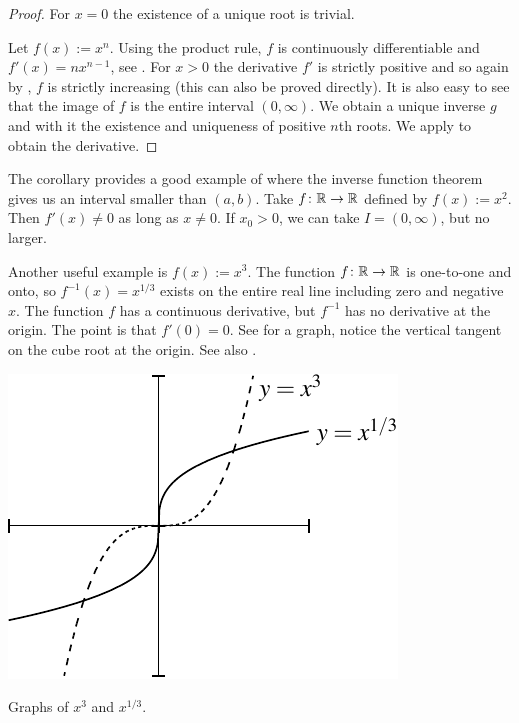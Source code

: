 \begin{proof}
For $x=0$ the existence of a unique root is trivial.

Let $f(x) := x^n$.  Using the product rule, $f$ is continuously differentiable
and $f'(x) = nx^{n-1}$, see .  For $x > 0$ the derivative $f'$ is strictly positive
and so again by , $f$ is strictly
increasing (this can also be proved directly).  It is also easy to
see that the image of $f$ is the entire interval $(0,\infty)$.  We 
obtain a unique inverse $g$ and with it the existence and uniqueness of positive
$n$th roots.  We apply  to obtain the derivative.
\end{proof}

\begin{example}
The corollary provides a good example of where the inverse function theorem
gives us an interval smaller than $(a,b)$.  Take $f \colon {\mathbb{R}} \to {\mathbb{R}}$
defined by $f(x) := x^2$.  Then $f'(x) \not= 0$
as long as $x \not= 0$.  If $x_0 > 0$, we can take $I=(0,\infty)$, but
no larger.
\end{example}

\begin{example}
Another useful example is $f(x) := x^3$.  The function $f \colon {\mathbb{R}} \to {\mathbb{R}}$ is
one-to-one and onto, so $f^{-1}(x) = x^{1/3}$ exists on the entire real
line including zero and negative $x$.  The function $f$ has
a continuous derivative, but $f^{-1}$ has no derivative at the origin.  The
point is that $f'(0) = 0$.  See  for a graph,
notice the vertical tangent on the cube root at the origin.
See also .
\begin{myfigureht}
\includegraphics{figures/cubecuberoot}
\caption{Graphs of $x^3$ and $x^{1/3}$.\label{cubecuberootfig}}
\end{myfigureht}
\end{example}


